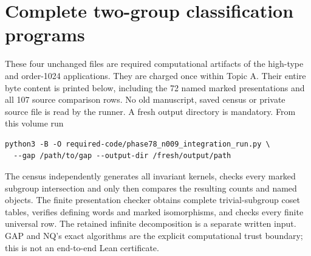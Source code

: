 \documentclass[11pt,a4paper]{article}
\begin{document}
\section*{Complete two-group classification programs}
These four unchanged files are required computational artifacts of the
high-type and order-1024 applications. They are charged once within
Topic A. Their entire byte content is printed below, including the 72
named marked presentations and all 107 source comparison rows.
No old manuscript, saved census or private source file is read by the
runner. A fresh output directory is mandatory. From this volume run
\begin{verbatim}
python3 -B -O required-code/phase78_n009_integration_run.py \
  --gap /path/to/gap --output-dir /fresh/output/path
\end{verbatim}
The census independently generates all invariant kernels, checks every
marked subgroup intersection and only then compares the resulting
counts and named objects. The finite presentation checker obtains
complete trivial-subgroup coset tables, verifies defining words and
marked isomorphisms, and checks every finite universal row. The
retained infinite decomposition is a separate written input.
GAP and NQ's exact algorithms are the explicit computational trust
boundary; this is not an end-to-end Lean certificate.
\end{document}
